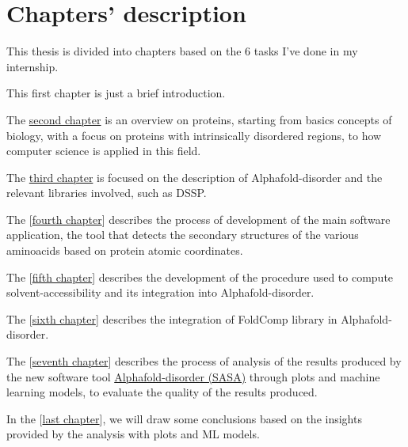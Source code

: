 \section{Chapters' description}
This thesis is divided into chapters based on the 6 tasks I've done in my internship.

This first chapter is just a brief introduction.

The {\hyperref[chp:proteins]{second chapter}} is an overview on proteins, starting from basics concepts of biology, with a focus on proteins with intrinsically disordered regions, to how computer science is applied in this field.

The {\hyperref[chp:alphafold-disorder]{third chapter}} is focused on the description of Alphafold-disorder and the relevant libraries involved, such as DSSP.

The [{\hyperref[cap:descrizione-architettura]{fourth chapter}}] describes the process of development of the main software application, the tool that detects the secondary structures of the various aminoacids based on protein atomic coordinates.

The [{\hyperref[cap:descrizione-architettura]{fifth chapter}}] describes the development of the procedure used to compute solvent-accessibility and its integration into Alphafold-disorder.

The [{\hyperref[cap:descrizione-architettura]{sixth chapter}}] describes the integration of FoldComp library in Alphafold-disorder.

The [{\hyperref[cap:descrizione-architettura]{seventh chapter}}] describes the process of analysis of the results produced by the new software tool \underline{Alphafold-disorder (SASA)} through plots and machine learning models, to evaluate the quality of the results produced.

In the [{\hyperref[cap:descrizione-architettura]{last chapter}}], we will draw some conclusions based on the insights provided by the analysis with plots and ML models.

